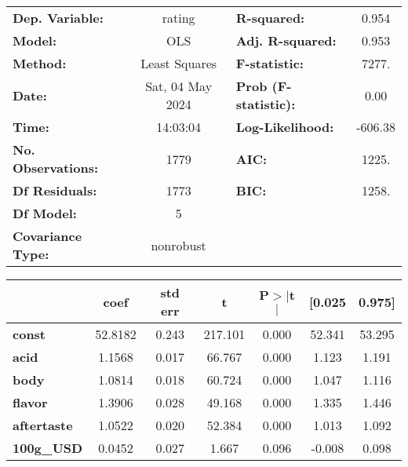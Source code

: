 \documentclass[11pt]{article}
\begin{document}
    \begin{center}
\begin{tabular}{lclc}
\toprule
\textbf{Dep. Variable:}    &      rating      & \textbf{  R-squared:         } &     0.954   \\
\textbf{Model:}            &       OLS        & \textbf{  Adj. R-squared:    } &     0.953   \\
\textbf{Method:}           &  Least Squares   & \textbf{  F-statistic:       } &     7277.   \\
\textbf{Date:}             & Sat, 04 May 2024 & \textbf{  Prob (F-statistic):} &     0.00    \\
\textbf{Time:}             &     14:03:04     & \textbf{  Log-Likelihood:    } &   -606.38   \\
\textbf{No. Observations:} &        1779      & \textbf{  AIC:               } &     1225.   \\
\textbf{Df Residuals:}     &        1773      & \textbf{  BIC:               } &     1258.   \\
\textbf{Df Model:}         &           5      & \textbf{                     } &             \\
\textbf{Covariance Type:}  &    nonrobust     & \textbf{                     } &             \\
\bottomrule
\end{tabular}
\begin{tabular}{lcccccc}
                    & \textbf{coef} & \textbf{std err} & \textbf{t} & \textbf{P$> |$t$|$} & \textbf{[0.025} & \textbf{0.975]}  \\
\midrule
\textbf{const}      &      52.8182  &        0.243     &   217.101  &         0.000        &       52.341    &       53.295     \\
\textbf{acid}       &       1.1568  &        0.017     &    66.767  &         0.000        &        1.123    &        1.191     \\
\textbf{body}       &       1.0814  &        0.018     &    60.724  &         0.000        &        1.047    &        1.116     \\
\textbf{flavor}     &       1.3906  &        0.028     &    49.168  &         0.000        &        1.335    &        1.446     \\
\textbf{aftertaste} &       1.0522  &        0.020     &    52.384  &         0.000        &        1.013    &        1.092     \\
\textbf{100g\_USD}  &       0.0452  &        0.027     &     1.667  &         0.096        &       -0.008    &        0.098     \\

\end{tabular}
\end{center}
\end{document}
